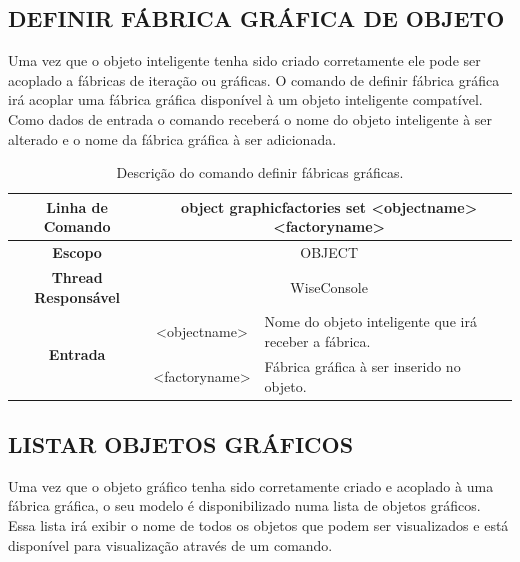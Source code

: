 \subsection{DEFINIR FÁBRICA GRÁFICA DE OBJETO}\label{sec:graphic_factories_set}

Uma vez que o objeto inteligente tenha sido criado corretamente ele pode ser acoplado a fábricas de iteração ou gráficas. O comando de definir fábrica gráfica irá acoplar uma fábrica gráfica disponível à um objeto inteligente compatível. Como dados de entrada o comando receberá o nome do objeto inteligente à ser alterado e o nome da fábrica gráfica à ser adicionada.

\begin{center}
	\begin{table}[!htbp]
		\begin{tabularx}{\textwidth}{c|c|X}
			\toprule
			\textbf{Linha de Comando} & \multicolumn{2}{c}{object graphic\underline{\space\space}factories set <object\underline{\space\space}name> <factory\underline{\space\space}name>} \\
			\midrule
			\textbf{Escopo} & \multicolumn{2}{c}{OBJECT} \\
			\hline
			\textbf{Thread Responsável} & \multicolumn{2}{c}{WiseConsole} \\
			\hline
			\multirow{2}{*}{\textbf{Entrada}} & <object\underline{\space\space}name> & Nome do objeto inteligente que irá receber a fábrica. \\
			& <factory\underline{\space\space}name> & Fábrica gráfica à ser inserido no objeto. \\
			\bottomrule
		\end{tabularx}
		\caption{Descrição do comando definir fábricas gráficas.}
		\label{tab:graphic_factories_set}
	\end{table}
\end{center}

\subsection{LISTAR OBJETOS GRÁFICOS}\label{sec:graphic_list}

Uma vez que o objeto gráfico tenha sido corretamente criado e acoplado à uma fábrica gráfica, o seu modelo é disponibilizado numa lista de objetos gráficos. Essa lista irá exibir o nome de todos os objetos que podem ser visualizados e está disponível para visualização através de um comando.


